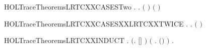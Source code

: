 \newcommand{\HOLTraceTheoremsLRTCXXCASESOne}{\UseVerbatim{HOLTraceTheoremsLRTCXXCASESOne}}
\begin{SaveVerbatim}{HOLTraceTheoremsLRTCXXCASESTwo}
\HOLTokenTurnstile{} \HOLSymConst{\HOLTokenForall{}}   .
            \HOLSymConst{\HOLTokenEquiv{}}
            \HOLSymConst{\ensuremath{=}} 
        \HOLSymConst{\HOLTokenExists{}}.    \ensuremath{(} \ensuremath{)}  \HOLSymConst{\HOLTokenConj{}}   \ensuremath{(} \ensuremath{)} 
\end{SaveVerbatim}
\newcommand{\HOLTraceTheoremsLRTCXXCASESTwo}{\UseVerbatim{HOLTraceTheoremsLRTCXXCASESTwo}}
\begin{SaveVerbatim}{HOLTraceTheoremsLRTCXXCASESXXLRTCXXTWICE}
\HOLTokenTurnstile{} \HOLSymConst{\HOLTokenForall{}}   .
            \HOLSymConst{\HOLTokenEquiv{}}
       \HOLSymConst{\HOLTokenExists{}}  .      \HOLSymConst{\HOLTokenConj{}}      \HOLSymConst{\HOLTokenConj{}} \ensuremath{(} \HOLSymConst{\ensuremath{=}}  \HOLSymConst{++} \ensuremath{)}
\end{SaveVerbatim}
\newcommand{\HOLTraceTheoremsLRTCXXCASESXXLRTCXXTWICE}{\UseVerbatim{HOLTraceTheoremsLRTCXXCASESXXLRTCXXTWICE}}
\begin{SaveVerbatim}{HOLTraceTheoremsLRTCXXINDUCT}
\HOLTokenTurnstile{} \HOLSymConst{\HOLTokenForall{}} .
       \ensuremath{(}\HOLSymConst{\HOLTokenForall{}}.   \ensuremath{[}\ensuremath{]} \ensuremath{)} \HOLSymConst{\HOLTokenConj{}}
       \ensuremath{(}\HOLSymConst{\HOLTokenForall{}}    .     \HOLSymConst{\HOLTokenConj{}}     \HOLSymConst{\HOLTokenImp{}}   \ensuremath{(}\HOLSymConst{::}\ensuremath{)} \ensuremath{)} \HOLSymConst{\HOLTokenImp{}}
       \HOLSymConst{\HOLTokenForall{}}  .      \HOLSymConst{\HOLTokenImp{}}    
\end{SaveVerbatim}
